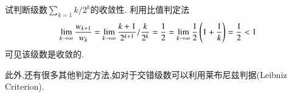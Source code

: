 \begin{examplebox}{试判断级数$\sum_{k=1} k/2^k$的收敛性.}
    利用比值判定法
    \[ 
        \lim_{k\to \infty} \frac{w_{k+1}}{w_k}=\lim_{k\to \infty} \frac{k+1}{2^{k+1}} / \frac{k}{2^{k}}=\frac{1}{2} 
        = \lim_{k\to \infty} \frac{1}{2}\left(1+\frac{1}{k}\right) 
        = {\frac{1}{2}} < 1
    \]
    可见该级数是收敛的.
\end{examplebox}

此外,还有很多其他判定方法,如对于交错级数可以利用莱布尼兹判据(Leibniz Criterion).
